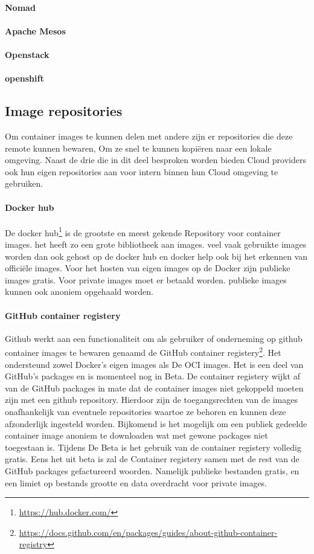 \paragraph{Nomad}
\paragraph{Apache Mesos}
\paragraph{Openstack}
\paragraph{openshift}
\subsection{Image repositories}
Om container images te kunnen delen met andere zijn er repositories die deze remote kunnen bewaren, Om ze snel te kunnen kopiëren naar een lokale omgeving. Naast de drie die in dit deel besproken worden bieden Cloud providers ook hun eigen repositories aan voor intern binnen hun Cloud omgeving te gebruiken.
\paragraph{Docker hub}
De docker hub\footnote{\url{https://hub.docker.com/}} is de grootste en meest gekende Repository voor container images. het heeft zo een grote bibliotheek aan images. veel vaak gebruikte images worden dan ook gehost op de docker hub en docker help ook bij het erkennen van officiële images. Voor het hosten van eigen images op de Docker zijn publieke images gratis. Voor private images moet er betaald worden. publieke images kunnen ook anoniem opgehaald worden.
\paragraph{GitHub container registery}
Github werkt aan een functionaliteit om als gebruiker of onderneming op github container images te bewaren genaamd de  GitHub container registery\footnote{\url{https://docs.github.com/en/packages/guides/about-github-container-registry}}. Het ondersteund zowel Docker’s eigen images als De OCI images. Het is een deel van GitHub’s packages en is momenteel nog in Beta. De container registery wijkt af van de GitHub packages in mate dat de container images niet gekoppeld moeten zijn met een github repository. Hierdoor zijn de toegangsrechten van de images onafhankelijk van eventuele repositories waartoe ze behoren en kunnen deze afzonderlijk ingesteld worden. Bijkomend is het mogelijk om een publiek gedeelde container image anoniem te downloaden wat met gewone packages niet toegestaan is. Tijdens De Beta is het gebruik van de container registery volledig gratis. Eens het uit beta is zal de Container registery samen met de rest van de GitHub packages gefactureerd woorden. Namelijk publieke bestanden gratis, en een limiet op bestands grootte en data overdracht voor private images.
